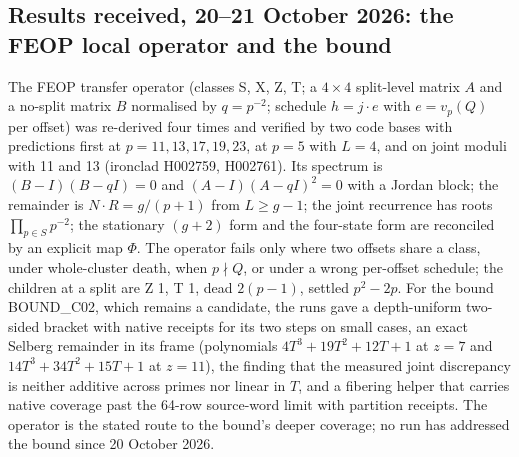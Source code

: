 \subsection{Results received, 20--21 October 2026: the FEOP local operator and the bound}
\label{v3c22:received}
The FEOP transfer operator (classes S, X, Z, T; a $4\times4$ split-level matrix $A$ and a no-split matrix $B$ normalised by $q=p^{-2}$; schedule $h=j\cdot e$ with $e=v_p(Q)$ per offset) was re-derived four times and verified by two code bases with predictions first at $p=11,13,17,19,23$, at $p=5$ with $L=4$, and on joint moduli with 11 and 13 (ironclad H002759, H002761).\cite{v3feop} Its spectrum is $(B-I)(B-qI)=0$ and $(A-I)(A-qI)^2=0$ with a Jordan block; the remainder is $N\cdot R=g/(p+1)$ from $L\ge g-1$; the joint recurrence has roots $\prod_{p\in S}p^{-2}$; the stationary $(g+2)$ form and the four-state form are reconciled by an explicit map $\Phi$. The operator fails only where two offsets share a class, under whole-cluster death, when $p\nmid Q$, or under a wrong per-offset schedule; the children at a split are Z 1, T 1, dead $2(p-1)$, settled $p^2-2p$. For the bound BOUND\_C02, which remains a candidate, the runs gave a depth-uniform two-sided bracket with native receipts for its two steps on small cases, an exact Selberg remainder in its frame (polynomials $4T^3+19T^2+12T+1$ at $z=7$ and $14T^3+34T^2+15T+1$ at $z=11$), the finding that the measured joint discrepancy is neither additive across primes nor linear in $T$, and a fibering helper that carries native coverage past the 64-row source-word limit with partition receipts. The operator is the stated route to the bound's deeper coverage; no run has addressed the bound since 20 October 2026.
